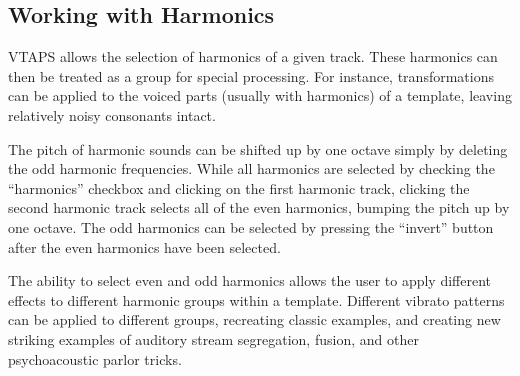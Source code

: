 \documentclass{article}
\begin{document}
\subsection{\label{sub:pitch-shifting}Working with Harmonics}

VTAPS allows the selection of harmonics of a given track. These 
harmonics can then be treated as a group for special processing. 
For instance, transformations can be applied to the voiced parts 
(usually with harmonics) of a template, leaving relatively 
noisy consonants intact. 

The pitch of harmonic sounds can be shifted up by one octave simply by deleting the
odd harmonic frequencies. While all harmonics are selected by checking the
``harmonics'' checkbox and clicking on the first harmonic track, clicking the
second harmonic track selects all of the even harmonics, bumping the
pitch up by one octave.
The odd harmonics can be selected by pressing the ``invert'' button after the
even harmonics have been selected.

The ability to select even and odd harmonics allows the user to apply different 
effects to different harmonic groups within a template. 
Different vibrato patterns can be applied to different groups, recreating 
classic examples, and creating new striking examples of auditory stream 
segregation, fusion, and other psychoacoustic parlor tricks. 

%
%
\end{document}
